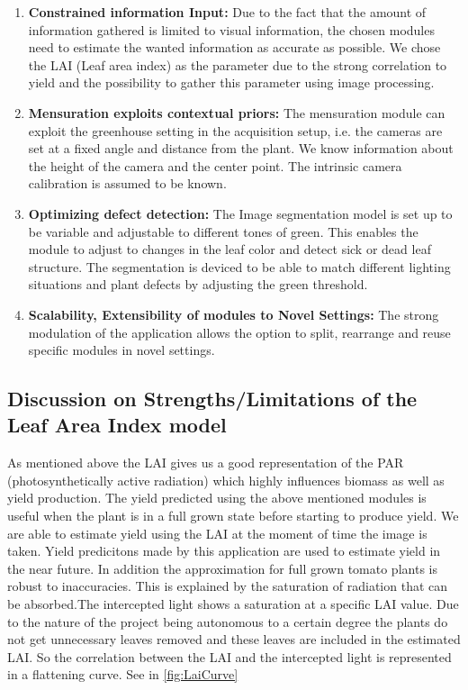 \begin{enumerate}
    \item \textbf{Constrained information Input:} Due to the fact that the amount of information gathered is limited to visual information, the chosen modules need to estimate the wanted information as accurate as possible. We chose the LAI (Leaf area index) as the parameter due to the strong correlation to yield \cite{heuvelink2004effect} and the possibility to gather this parameter using image processing.

    \item \textbf{Mensuration exploits contextual priors:} The mensuration module can exploit the greenhouse setting in the acquisition setup, i.e. the cameras are set at a fixed angle and distance from the plant. We know information about the height of the camera and the center point. The intrinsic camera calibration is assumed to be known.

    \item \textbf{Optimizing defect detection:} The Image segmentation model is set up to be variable and adjustable to different tones of green. This enables the module to adjust to changes in the leaf color and detect sick or dead leaf structure. The segmentation is deviced to be able to match different lighting situations and plant defects by adjusting the green threshold.

    \item \textbf{Scalability, Extensibility of modules to Novel Settings:} The strong modulation of the application allows the option to split, rearrange and reuse specific modules in novel settings.
\end{enumerate}

\subsection{Discussion on Strengths/Limitations of the Leaf Area Index model}


As mentioned above the LAI gives us a good representation of the PAR (photosynthetically active radiation) which highly influences biomass as well as yield production. \cite{hossain2017leaf} The yield predicted using the above mentioned modules is  useful when the plant is in a full grown state before starting to produce yield. We are able to estimate yield using the LAI at the moment of time the image is taken. Yield predicitons made by this application are used to estimate yield in the near future. In addition the approximation for full grown tomato plants is robust to inaccuracies. This is explained by the saturation of radiation that can be absorbed.The intercepted light shows a saturation at a specific LAI value. Due to the nature of the project being autonomous to a certain degree the plants do not get unnecessary leaves removed and these leaves are included in the estimated LAI. So the correlation between the LAI and the intercepted light is represented in a flattening curve. See in \ref{fig:LaiCurve}\\

